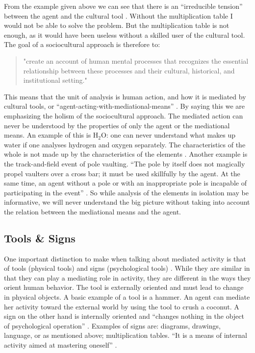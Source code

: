 From the example given above we can see that there is an “irreducible tension” between the agent and the cultural tool \citep{wertsch1998mind}. Without the multiplication table I would not be able to solve the problem. But the multiplication table is not enough, as it would have been useless without a skilled user of the cultural tool. The goal of a sociocultural approach is therefore to: 

\begin{quote}
"create an account of human mental processes that recognizes the essential relationship between these processes and their cultural, historical, and institutional setting."\citep{wertsch1998mind} 
\end{quote}

This means that the unit of analysis is human action, and how it is mediated by cultural tools, or “agent-acting-with-mediational-means” \citep[\citealp{wertsch1993sociocultural} cited in][]{wertsch1998mind}. By saying this we are emphasizing the holism of the sociocultural approach. The mediated action can never be understood by the properties of only the agent or the mediational means. An example of this is $\text{H}_2\text{O}$: one can never understand what makes up water if one analyses hydrogen and oxygen separately. The characteristics of the whole is not made up by the characteristics of the elements \citep{vygotskiui1978mind}. Another example is the track-and-field event of pole vaulting. “The pole by itself does not magically propel vaulters over a cross bar; it must be used skillfully by the agent. At the same time, an agent without a pole or with an inappropriate pole is incapable of participating in the event” \citep{wertsch1998mind}. So while analysis of the elements in isolation may be informative, we will never understand the big picture without taking into account the relation between the mediational means and the agent.  

\subsection{Tools \& Signs}
One important distinction to make when talking about mediated activity is that of tools (physical tools) and signs (psychological tools) \citep{vygotskiui1978mind}. While they are similar in that they can play a mediating role in activity, they are different in the ways they orient human behavior. The tool is externally oriented and must lead to change in physical objects. A basic example of a tool is a hammer. An agent can mediate her activity toward the external world by using the tool to crush a coconut. A sign on the other hand is internally oriented and “changes nothing in the object of psychological operation” \citep{vygotskiui1978mind}. Examples of signs are: diagrams, drawings, language, or as mentioned above; multiplication tables. “It is a means of internal activity aimed at mastering oneself” \citep{vygotskiui1978mind}. 

